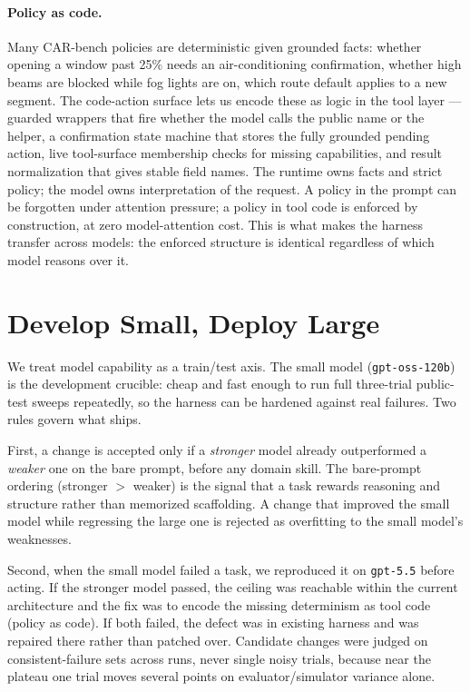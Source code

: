 \documentclass{article}
\begin{document}
\paragraph{Policy as code.}
Many CAR-bench policies are deterministic given grounded facts: whether opening a
window past 25\% needs an air-conditioning confirmation, whether high beams are
blocked while fog lights are on, which route default applies to a new segment.
The code-action surface lets us encode these as logic in the tool layer ---
guarded wrappers that fire whether the model calls the public name or the helper,
a confirmation state machine that stores the fully grounded pending action,
live tool-surface membership checks for missing capabilities, and result
normalization that gives stable field names. The runtime owns facts and strict
policy; the model owns interpretation of the request. A policy in the prompt can
be forgotten under attention pressure; a policy in tool code is enforced by
construction, at zero model-attention cost. This is what makes the harness
transfer across models: the enforced structure is identical regardless of which
model reasons over it.

\section{Develop Small, Deploy Large}

We treat model capability as a train/test axis. The small model
(\texttt{gpt-oss-120b}) is the development crucible: cheap and fast enough to run
full three-trial public-test sweeps repeatedly, so the harness can be hardened
against real failures. Two rules govern what ships.

First, a change is accepted only if a \emph{stronger} model already outperformed
a \emph{weaker} one on the bare prompt, before any domain skill. The bare-prompt
ordering (stronger $>$ weaker) is the signal that a task rewards reasoning and
structure rather than memorized scaffolding. A change that improved the small
model while regressing the large one is rejected as overfitting to the small
model's weaknesses.

Second, when the small model failed a task, we reproduced it on \texttt{gpt-5.5}
before acting. If the stronger model passed, the ceiling was reachable within the
current architecture and the fix was to encode the missing determinism as tool
code (policy as code). If both failed, the defect was in existing harness and was
repaired there rather than patched over. Candidate changes were judged on
consistent-failure sets across runs, never single noisy trials, because near the
plateau one trial moves several points on evaluator/simulator variance alone.
\end{document}
